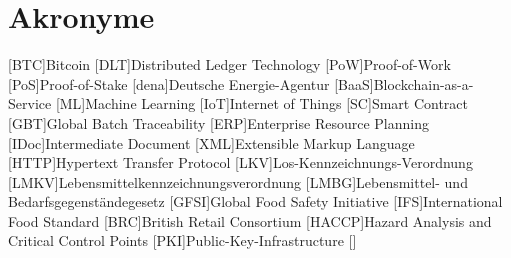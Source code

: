 \section*{Akronyme}            %
\begin{acronym}[HACCP]
	[BTC]{Bitcoin}
	[DLT]{Distributed Ledger Technology}
	[PoW]{Proof-of-Work}
	[PoS]{Proof-of-Stake}
	[dena]{Deutsche Energie-Agentur}
	[BaaS]{Blockchain-as-a-Service}
	[ML]{Machine Learning}
	[IoT]{Internet of Things}
	[SC]{Smart Contract}
  [GBT]{Global Batch Traceability}
  [ERP]{Enterprise Resource Planning}
  [IDoc]{Intermediate Document}
  [XML]{Extensible Markup Language}
  [HTTP]{Hypertext Transfer Protocol}
  [LKV]{Los-Kennzeichnungs-Verordnung}
  [LMKV]{Lebensmittelkennzeichnungsverordnung}
  [LMBG]{Lebensmittel- und Bedarfsgegenständegesetz}
  [GFSI]{Global Food Safety Initiative}
  [IFS]{International Food Standard}
  [BRC]{British Retail Consortium}
  [HACCP]{Hazard Analysis and Critical Control Points}
  [PKI]{Public-Key-Infrastructure}
  \acro{}[]{}
\end{acronym}

\newpage

\listoffigures
{}
\listoftables
{}
\newpage
